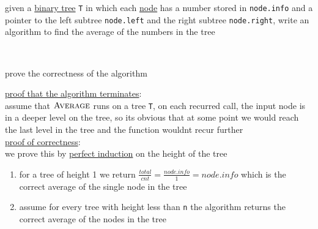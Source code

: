 \documentclass[a4paper,12pt]{article}
\begin{document}
\newenvironment{note}
  {\begin{bclogo}[logo=\bcinfo, couleurBarre=orange, couleur=lightgray]{ note}}
  {\end{bclogo}}
\newenvironment{attention}
  {\begin{bclogo}[logo=\bcattention, couleurBarre=red, noborder=true, 
                couleur=red!15]{Important!}}
  {\end{bclogo}}

\begin{question}
given a \href{2022-12-14T21_56_40.428Z.Desktop.org}{binary tree} \texttt{T} in which each \href{2022-12-14T21_56_40.428Z.Desktop.org}{node} has a number stored in \texttt{node.info} and a pointer to the left subtree \texttt{node.left} and the right subtree \texttt{node.right}, write an algorithm to find the average of the numbers in the tree\\[0pt]
\begin{answer}
\begin{center}

\end{center}\\[0pt]
\end{answer}
\begin{subquestion}
prove the correctness of the algorithm\\[0pt]
\begin{answer}
\uline{proof that the algorithm terminates}:\\[0pt]
assume that \(\textsc{Average}\) runs on a tree \texttt{T}, on each recurred call, the input node is in a deeper level on the tree, so its obvious that at some point we would reach the last level in the tree and the function wouldnt recur further\\[0pt]
\uline{proof of correctness}:\\[0pt]
we prove this by \href{20220707193301-mathematical_induction.org}{perfect induction} on the height of the tree\\[0pt]
\begin{enumerate}
\item for a tree of height 1 we return \(\frac{total}{cnt} = \frac{node.info}{1} = node.info\) which is the correct average of the single node in the tree\\[0pt]
\item assume for every tree with height less than \texttt{n} the algorithm returns the correct average of the nodes in the tree\\[0pt]

\end{enumerate}
\end{answer}
\end{subquestion}
\end{question}
\end{document}
